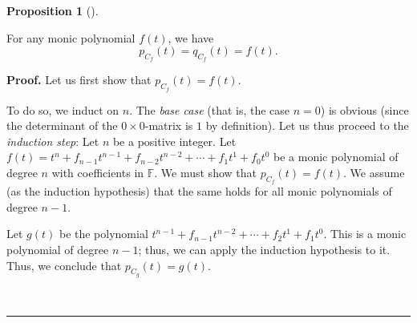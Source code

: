 \documentclass[numbers=enddot,12pt,final,onecolumn,notitlepage]{scrartcl}%
\numberwithin{exer}{subsection}
\theoremstyle{definition}
\newtheorem{prop}[theo]{Proposition}
\newenvironment{proposition}[1][]
{\begin{prop}[#1]\begin{leftbar}}
{\end{leftbar}\end{prop}}
\newenvironment{proof}[1][Proof]{\noindent\textbf{#1.} }{\ \rule{0.5em}{0.5em}}
\begin{document}
\begin{proposition}
\label{prop.jnf.companion.pCf=qCf=f}For any monic polynomial $f\left(
t\right)  $, we have%
\[
p_{C_{f}}\left(  t\right)  =q_{C_{f}}\left(  t\right)  =f\left(  t\right)  .
\]

\end{proposition}

\begin{proof}
Let us first show that $p_{C_{f}}\left(  t\right)  =f\left(  t\right)  $.

To do so, we induct on $n$. The \textit{base case} (that is, the case $n=0$)
is obvious (since the determinant of the $0\times0$-matrix is $1$ by
definition). Let us thus proceed to the \textit{induction step}: Let $n$ be a
positive integer. Let $f\left(  t\right)  =t^{n}+f_{n-1}t^{n-1}+f_{n-2}%
t^{n-2}+\cdots+f_{1}t^{1}+f_{0}t^{0}$ be a monic polynomial of degree $n$ with
coefficients in $\mathbb{F}$. We must show that $p_{C_{f}}\left(  t\right)
=f\left(  t\right)  $. We assume (as the induction hypothesis) that the same
holds for all monic polynomials of degree $n-1$.

Let $g\left(  t\right)  $ be the polynomial $t^{n-1}+f_{n-1}t^{n-2}%
+\cdots+f_{2}t^{1}+f_{1}t^{0}$. This is a monic polynomial of degree $n-1$;
thus, we can apply the induction hypothesis to it. Thus, we conclude that
$p_{C_{g}}\left(  t\right)  =g\left(  t\right)  $.


\end{proof}
\end{document}
